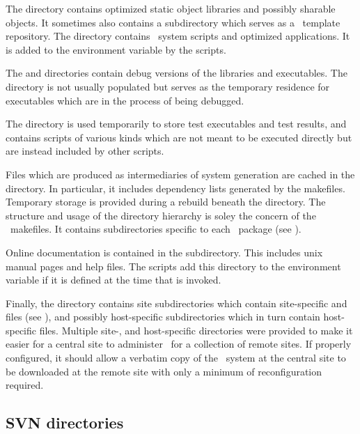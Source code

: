 \noindent
The  directory contains optimized static object libraries and
possibly sharable objects.  It sometimes also contains a subdirectory which
serves as a \cplusplus\ template repository.  The  directory
contains \casa\ system scripts and optimized applications.  It is added to
the  environment variable by the  scripts.

The  and  directories contain debug versions of the
libraries and executables.  The  directory is not usually
populated but serves as the temporary residence for executables which are in
the process of being debugged.

The  directory is used temporarily to store test executables and
test results, and  contains scripts of various kinds which are
not meant to be executed directly but are instead included by other scripts.

Files which are produced as intermediaries of system generation are cached in
the  directory.  In particular, it includes dependency lists
generated by the makefiles.  Temporary storage is provided during a rebuild
beneath the  directory.  The structure and usage of the 
directory hierarchy is soley the concern of the \casa\ makefiles.  It
contains subdirectories specific to each \casa\ package (see
).

Online documentation is contained in the  subdirectory.  This
includes unix manual pages and help files.  The  scripts add
this directory to the  environment variable if it is defined at
the time that  is invoked.

Finally, the  directory contains site subdirectories which
contain site-specific  and  files (see
), and possibly host-specific subdirectories which
in turn contain host-specific  files.  Multiple site-, and
host-specific directories were provided to make it easier for a central site
to administer \casa\ for a collection of remote sites.  If properly
configured, it should allow a verbatim copy of the \casa\ system at the
central site to be downloaded at the remote site with only a minimum of
reconfiguration required.


\subsection{SVN directories}
\label{svn directories}

